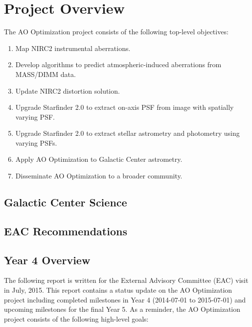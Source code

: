\section{Project Overview}
\label{sec:overview}

The AO Optimization project consists of the following top-level
objectives:

\begin{enumerate}
\item Map NIRC2 instrumental aberrations.
\item Develop algorithms to predict atmospheric-induced aberrations
  from MASS/DIMM data.
\item Update NIRC2 distortion solution.
\item Upgrade Starfinder 2.0 to extract on-axis PSF from image with
  spatially varying PSF.
\item Upgrade Starfinder 2.0 to extract stellar astrometry and
  photometry using varying PSFs.
\item Apply AO Optimization to Galactic Center astrometry.
\item Disseminate AO Optimization to a broader community.
\end{enumerate}

\subsection{Galactic Center Science}


\subsection{EAC Recommendations}

\subsection{Year 4 Overview}
The following report is written for the External Advisory Committee (EAC) visit in July, 2015. This report contains a status update on the AO Optimization project including completed milestones in Year 4 (2014-07-01 to 2015-07-01) and upcoming milestones for the final Year 5. As a reminder, the AO Optimization project consists of the following high-level goals:

  
  